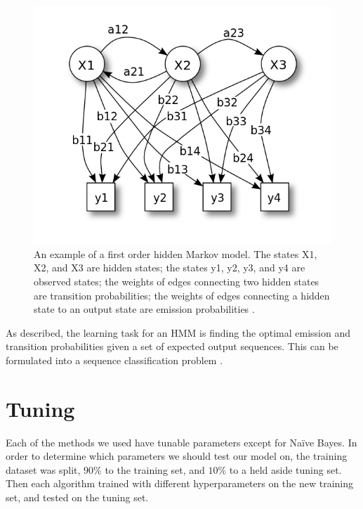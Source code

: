 \documentclass{article}
\begin{document}
\begin{figure}[!ht]
    \centering
    \includegraphics[scale=.4]{HiddenMarkovModel.png}
    \caption{An example of a first order hidden Markov model. The states X1, X2, and X3
    are hidden states; the states y1, y2, y3, and y4 are observed states;
    the weights of edges connecting two hidden states are transition probabilities;
    the weights of edges connecting a hidden state to an output state are
    emission probabilities \cite{hiddenmarkovmodel}.}
    \label{fig:hmm}
\end{figure}

As described, the learning task for an HMM is finding the optimal emission and
transition probabilities given a set of expected output sequences. This can
be formulated into a sequence classification problem \cite{hmm}.



\section{Tuning}
Each of the methods we used have tunable parameters except for Na\"ive Bayes. In order to determine which parameters we should test our model on, the training dataset was split, $90\%$ to the training set, and $10\%$ to a held aside tuning set. Then each algorithm trained with different hyperparameters on the new training set, and tested on the tuning set.  
\end{document}

